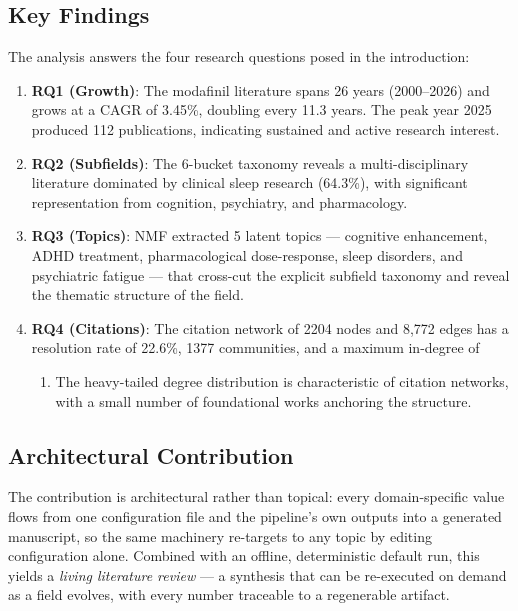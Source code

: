 \documentclass[
  english,
]{article}
\providecommand{\tightlist}{%
  \setlength{\itemsep}{0pt}\setlength{\parskip}{0pt}}
\begin{document}
\subsection{Key Findings}\label{key-findings}

The analysis answers the four research questions posed in the
introduction:

\begin{enumerate}
\def\labelenumi{\arabic{enumi}.}
\item
  \textbf{RQ1 (Growth)}: The modafinil literature spans 26 years
  (2000--2026) and grows at a CAGR of 3.45\%, doubling every 11.3 years.
  The peak year 2025 produced 112 publications, indicating sustained and
  active research interest.
\item
  \textbf{RQ2 (Subfields)}: The 6-bucket taxonomy reveals a
  multi-disciplinary literature dominated by clinical sleep research
  (64.3\%), with significant representation from cognition, psychiatry,
  and pharmacology.
\item
  \textbf{RQ3 (Topics)}: NMF extracted 5 latent topics --- cognitive
  enhancement, ADHD treatment, pharmacological dose-response, sleep
  disorders, and psychiatric fatigue --- that cross-cut the explicit
  subfield taxonomy and reveal the thematic structure of the field.
\item
  \textbf{RQ4 (Citations)}: The citation network of 2204 nodes and 8,772
  edges has a resolution rate of 22.6\%, 1377 communities, and a maximum
  in-degree of

  \begin{enumerate}
  \def\labelenumii{\arabic{enumii}.}
  \setcounter{enumii}{164}
  \tightlist
  \item
    The heavy-tailed degree distribution is characteristic of citation
    networks, with a small number of foundational works anchoring the
    structure.
  \end{enumerate}
\end{enumerate}

\subsection{Architectural
Contribution}\label{architectural-contribution}

The contribution is architectural rather than topical: every
domain-specific value flows from one configuration file and the
pipeline's own outputs into a generated manuscript, so the same
machinery re-targets to any topic by editing configuration alone.
Combined with an offline, deterministic default run, this yields a
\emph{living literature review} --- a synthesis that can be re-executed
on demand as a field evolves, with every number traceable to a
regenerable artifact.
\end{document}
